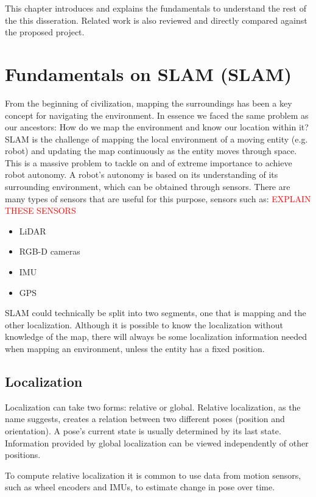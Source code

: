This chapter introduces and explains the fundamentals to understand the rest of the this disseration. Related work is also reviewed and directly compared against the proposed project.

\section{Fundamentals on \acl*{SLAM} (\acs*{SLAM})}

From the beginning of civilization, mapping the surroundings has been a key concept for navigating the environment. In essence we faced the same problem as our ancestors: How do we map the environment and know our location within it? \acs*{SLAM} is the challenge of mapping the local environment of a moving entity (e.g. robot) and updating the map continuously as the entity moves through space. This is a massive problem to tackle on and of extreme importance to achieve robot autonomy. A robot's autonomy is based on its understanding of its surrounding environment, which can be obtained through sensors. There are many types of sensors that are useful for this purpose, sensors such as:
\textcolor{red}{EXPLAIN THESE SENSORS}
\begin{itemize}
    \item \acs*{LiDAR}
    \item RGB-D cameras
    \item \acs*{IMU}
    \item \acs*{GPS}
\end{itemize}

\acs*{SLAM} could technically be split into two segments, one that is mapping and the other localization. Although it is possible to know the localization without knowledge of the map, there will always be some localization information needed when mapping an environment, unless the entity has a fixed position.

\subsection{Localization}
Localization can take two forms: relative or global. Relative localization, as the name suggests, creates a relation between two different poses (position and orientation). A pose's current state is usually determined by its last state. Information provided by global localization can be viewed independently of other positions.

To compute relative localization it is common to use data from motion sensors, such as wheel encoders and \acs*{IMU}s, to estimate change in pose over time.


